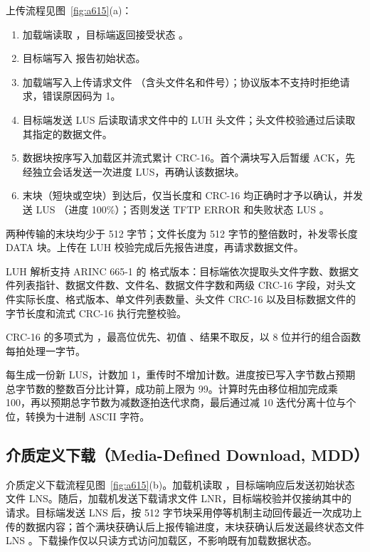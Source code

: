 上传流程见图~\ref{fig:a615}(a)：
\begin{enumerate}
  \item 加载端读取 ，目标端返回接受状态 。
  \item 目标端写入  报告初始状态。
  \item 加载端写入上传请求文件 （含头文件名和件号）；协议版本不支持时拒绝请求，错误原因码为 1。
  \item 目标端发送 LUS  后读取请求文件中的 LUH 头文件；头文件校验通过后读取其指定的数据文件。
  \item 数据块按序写入加载区并流式累计 CRC-16。首个满块写入后暂缓 ACK，先经独立会话发送一次进度 LUS，再确认该数据块。
  \item 末块（短块或空块）到达后，仅当长度和 CRC-16 均正确时才予以确认，并发送 LUS （进度 100\%）；否则发送 TFTP ERROR 和失败状态 LUS 。
\end{enumerate}


两种传输的末块均少于 512 字节；文件长度为 512 字节的整倍数时，补发零长度 DATA 块。上传在 LUH 校验完成后先报告进度，再请求数据文件。

LUH 解析支持 ARINC 665-1 的  格式版本：目标端依次提取头文件字数、数据文件列表指针、数据文件数、文件名、数据文件字数和两级 CRC-16 字段，对头文件实际长度、格式版本、单文件列表数量、头文件 CRC-16 以及目标数据文件的字节长度和流式 CRC-16 执行完整校验。

CRC-16 的多项式为 ，最高位优先、初值 、结果不取反，以 8 位并行的组合函数每拍处理一字节。

每生成一份新 LUS，计数加 1，重传时不增加计数。进度按已写入字节数占预期总字节数的整数百分比计算，成功前上限为 99。计算时先由移位相加完成乘 100，再以预期总字节数为减数逐拍迭代求商，最后通过减 10 迭代分离十位与个位，转换为十进制 ASCII 字符。

\subsection{介质定义下载（Media-Defined Download, MDD）}

介质定义下载流程见图~\ref{fig:a615}(b)。加载机读取 ，目标端响应后发送初始状态文件 LNS。随后，加载机发送下载请求文件 LNR，目标端校验并仅接纳其中的  请求。目标端发送 LNS  后，按 512 字节块采用停等机制主动回传最近一次成功上传的数据内容；首个满块获确认后上报传输进度，末块获确认后发送最终状态文件 LNS 。下载操作仅以只读方式访问加载区，不影响既有加载数据状态。

